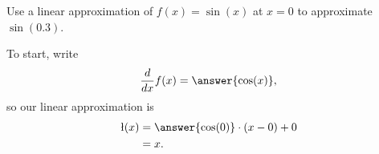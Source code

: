\begin{example}
  Use a linear approximation of $f(x) =\sin(x)$
  at $x=0$ to approximate $\sin(0.3)$.
  
  \begin{explanation}
    To start, write
    \[
      \frac{d}{dx} f(x) = \answer{\cos(x)},
    \]
    so our linear approximation is
    \begin{align*}
    \l(x) &= \answer{\cos(0)} \cdot (x-0) + 0 \\
          &= x.
    \end{align*}
  \end{explanation}
\end{example}
